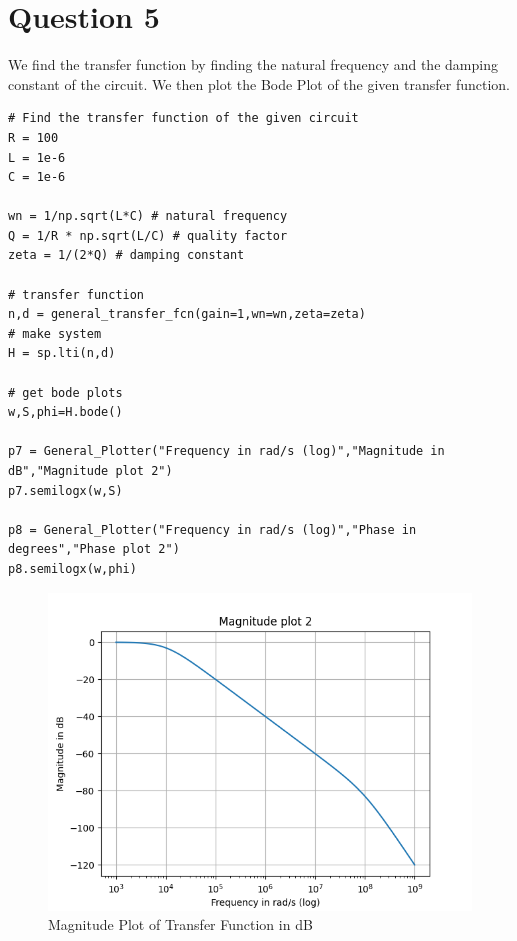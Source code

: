 \documentclass{article}
\begin{document}
\section*{Question 5}\label{Question-5}

We find the transfer function by finding the natural frequency and the
damping constant of the circuit. We then plot the Bode Plot of the given transfer
function.

\begin{lstlisting}
# Find the transfer function of the given circuit
R = 100
L = 1e-6
C = 1e-6

wn = 1/np.sqrt(L*C) # natural frequency
Q = 1/R * np.sqrt(L/C) # quality factor
zeta = 1/(2*Q) # damping constant

# transfer function
n,d = general_transfer_fcn(gain=1,wn=wn,zeta=zeta)
# make system
H = sp.lti(n,d)

# get bode plots
w,S,phi=H.bode()

p7 = General_Plotter("Frequency in rad/s (log)","Magnitude in dB","Magnitude plot 2")
p7.semilogx(w,S)

p8 = General_Plotter("Frequency in rad/s (log)","Phase in degrees","Phase plot 2")
p8.semilogx(w,phi)

\end{lstlisting}
    
\begin{figure}[h!]
    \centering
    \includegraphics[scale=0.6]{plots/Magnitude plot 2.png}
    \caption{Magnitude Plot of Transfer Function in dB}
    \label{Magnitude Plot 2}
\end{figure}
\end{document}
